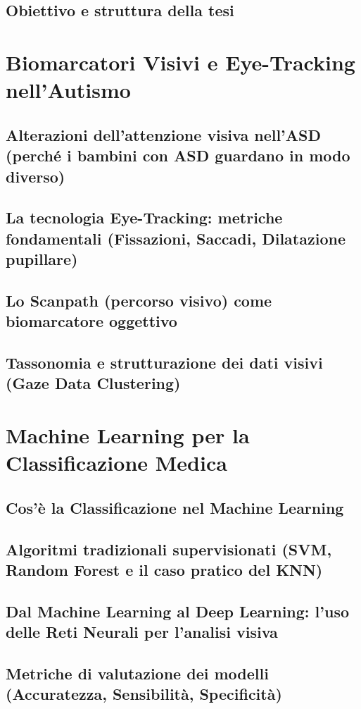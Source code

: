 \documentclass[12pt,a4paper,twoside]{book}
\begin{document}
\section{Obiettivo e struttura della tesi}
\chapter{Biomarcatori Visivi e Eye-Tracking nell'Autismo}
\section{Alterazioni dell'attenzione visiva nell'ASD (perché i bambini con ASD guardano in modo diverso)}
\section{La tecnologia Eye-Tracking: metriche fondamentali (Fissazioni, Saccadi, Dilatazione pupillare)}
\section{Lo Scanpath (percorso visivo) come biomarcatore oggettivo}
\section{Tassonomia e strutturazione dei dati visivi (Gaze Data Clustering)}
\chapter{Machine Learning per la Classificazione Medica}
\section{Cos'è la Classificazione nel Machine Learning}
\section{Algoritmi tradizionali supervisionati (SVM, Random Forest e il caso pratico del KNN)}
\section{Dal Machine Learning al Deep Learning: l'uso delle Reti Neurali per l'analisi visiva}
\section{Metriche di valutazione dei modelli (Accuratezza, Sensibilità, Specificità)}
\end{document}
